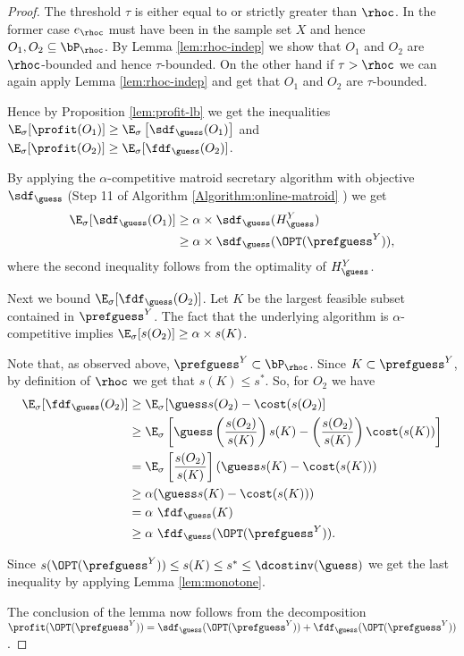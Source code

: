 \begin{proof}
 The threshold $\tau$ is either equal to or strictly greater than
 $\rhoc$. In the former case $e_\rhoc$ must have been in the sample
 set $X$ and hence $O_1, O_2 \subseteq \bP_\rhoc$. By Lemma \ref{lem:rhoc-indep} we show that $O_1$ and $O_2$ are
 $\rhoc$-bounded and hence $\tau$-bounded. On the other hand if $\tau
 > \rhoc$ we can again apply Lemma \ref{lem:rhoc-indep} and get that
 $O_1$ and $O_2$ are $\tau$-bounded.
 
Hence by Proposition \ref{lem:profit-lb} we get the inequalities
$\E_\sigma[\profit(O_1)] \geq \E_\sigma\left[ \sdf_\guess(O_1)\right]$
and $\E_\sigma[\profit(O_2)] \geq \E_\sigma[ \fdf_\guess(O_2)]$.
  
  By applying the $\alpha$-competitive matroid secretary algorithm with
  objective $\sdf_\guess$ (Step 11 of Algorithm
  \ref{Algorithm:online-matroid} ) we get
  \begin{align*}
    \E_\sigma[ \sdf_\guess(O_1) ] &\geq \alpha \times \sdf_\guess(
    H_\guess^Y) \\ &\geq \alpha \times \sdf_\guess(\OPT(\prefguess^Y)),
  \end{align*}
\noindent where the second inequality follows from the optimality of $H_\guess^Y$. 

Next we bound $\E_\sigma[\fdf_\guess(O_2)]$. Let
$K$ be the largest feasible subset contained in $\prefguess^Y$. The
fact that the underlying algorithm is $\alpha$-competitive implies
$\E_\sigma[s(O_2)] \geq \alpha \times s(K)$.

Note that, as observed above, $\prefguess^Y \subset \bP_\rhoc$. Since $K \subset \prefguess^Y $, by definition of $\rhoc$ we get that $s(K) \leq
s^*$. So, for $O_2$ we have
  \begin{align*}
    \E_\sigma[\fdf_\guess(O_2)] &\geq \E_\sigma[\guess s(O_2) -
      \cost(s(O_2)]\\ &\geq \E_\sigma\left[\guess
      \left(\frac{s(O_2)}{s(K)}\right) s(K) -
      \left(\frac{s(O_2)}{s(K)}\right) \cost(s(K))\right] \\
      & = \E_\sigma\left[\frac{s(O_2)}{s(K)}\right] \left(\guess s(K) -
    \cost(s(K))\right)\\ 
    &\geq \alpha (\guess s(K) - \cost(s(K)))\\ & = \alpha
    \ \fdf_\guess(K) \\ & \geq \alpha \ \fdf_\guess(\OPT(\prefguess^Y)).
  \end{align*}

\noindent Since $s(\OPT(\prefguess^Y)) \leq s(K) \leq s^* \leq
\dcostinv(\guess)$ we get the last inequality by applying Lemma
\ref{lem:monotone}.

  The conclusion of the lemma now follows from the decomposition
  $\profit(\OPT(\prefguess^Y)) = \sdf_\guess(\OPT(\prefguess^Y)) +
  \fdf_\guess (\OPT(\prefguess^Y) ) $.
  \end{proof}

